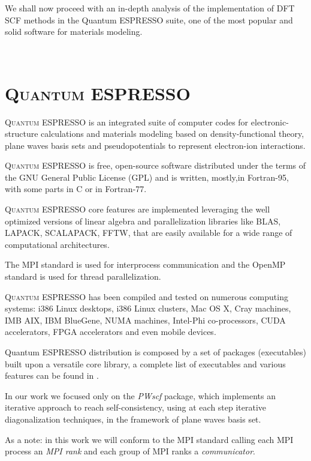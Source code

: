 \documentclass[a4paper,12pt]{article}
\newcommand\QE{\textsc{Quantum} ESPRESSO }
\begin{document}
We shall now proceed with an in-depth analysis of the implementation of DFT SCF methods in the Quantum ESPRESSO suite, one of the most popular and solid software for materials modeling.


\newpage

~

\newpage
\section{\QE}\label{sec:QE}

\QE  is an integrated suite of computer codes for electronic-structure calculations and materials modeling based on density-functional theory, plane waves basis sets and pseudopotentials to represent electron-ion interactions.

\QE is free, open-source software distributed under the terms of the GNU General Public License (GPL) and is written, mostly,in Fortran-95, with some parts in C or in Fortran-77.

\QE core features are implemented leveraging the well optimized versions of linear algebra and parallelization libraries like BLAS\cite{BLAS}, LAPACK\cite{LAPACK}, SCALAPACK\cite{SCALAPACK}, FFTW\cite{FFTW}, that are easily available for a wide range of computational architectures.

The MPI standard\cite{MPI} is used for interprocess communication and the OpenMP standard\cite{OMP} is used for thread parallelization.


\QE has been compiled and tested on numerous computing systems\cite{QEManual}: i386 Linux desktops, i386 Linux clusters, Mac OS X, Cray machines, IMB AIX, IBM BlueGene, NUMA machines, Intel-Phi co-processors, CUDA accelerators, FPGA accelerators and even mobile devices. 

Quantum ESPRESSO distribution is composed by a set of packages (executables) built upon a versatile core library, a complete list of executables and various features can be found in \cite{QE}.

In our work we focused only on the \textit{PWscf} package, which implements an iterative approach to reach self-consistency, using at each step iterative diagonalization techniques, in the framework of plane waves basis set.

As a note: in this work we will conform to the MPI standard calling each MPI process an \textit{MPI rank} and each group of MPI ranks a \textit{communicator}.
\end{document}
